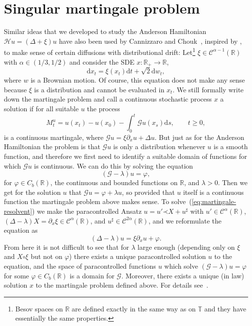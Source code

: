 \documentclass[a4paper, 11pt]{article}
\newcommand{\mathd}{\mathrm{d}}
\newcommand{\para}{\mathord{\prec}}
\newcommand{\reso}{\mathord{\circ}}
\begin{document}
\section{Singular martingale problem}
\label{sec:operators2}
Similar ideas that we developed to study the Anderson Hamiltonian
$\mathcal{H}u = (\Delta + \xi) u$ have also been used by Cannizzaro and Chouk~\cite{cannizzaro_multidimensional_2015}, inspired by \cite{delarue_rough_2016}, to make sense
of certain diffusions with distributional drift: Let\footnote{Besov spaces on $\mathbb{R}$ are defined exactly in the same way as on $\mathbb{T}$ and they have essentially the same properties.} $\xi \in
\mathcal{C}^{\alpha - 1} (\mathbb{R})$ with $\alpha \in (1 / 3, 1 / 2)$ and
consider the SDE $x\colon \mathbb{R}_+ \rightarrow \mathbb{R}$,
\[ \mathd x_t = \xi (x_t) \mathd t + \sqrt{2} \mathd w_t, \]
where $w$ is a Brownian motion. Of course, this equation does not make any
sense because $\xi$ is a distribution and cannot be evaluated in $x_t$. We
still formally write down the martingale problem and call a continuous
stochastic process $x$ a solution if for all suitable $u$ the process
\[ M^u_t = u (x_t) - u (x_0) - \int_0^t \mathcal{G}u (x_s) \mathd s, \qquad t
   \geqslant 0, \]
is a continuous martingale, where $\mathcal{G}u = \xi \partial_x u + \Delta
u$. But just as for the Anderson Hamiltonian the problem is that
$\mathcal{G}u$ is only a distribution whenever $u$ is a smooth function, and
therefore we first need to identify a suitable domain of functions for which
$\mathcal{G}u$ is continuous. We can do this by solving the equation
\begin{equation}
  \label{eq:martingale-resolvent} (\mathcal{G}- \lambda) u = \varphi,
\end{equation}
for $\varphi \in C_b (\mathbb{R})$, the continuous and bounded functions on
$\mathbb{R}$, and $\lambda > 0$. Then we get for the solution $u$ that
$\mathcal{G}u = \varphi + \lambda u$, so provided that $u$ itself is a
continuous function the martingale problem above makes sense. To
solve~(\ref{eq:martingale-resolvent}) we make the paracontrolled Ansatz $u = u' \para X +
u^{\sharp}$ with $u' \in \mathcal{C}^{\alpha} (\mathbb{R})$, $(\Delta -
\lambda) X = \partial_x \xi \in \mathcal{C}^{\alpha} (\mathbb{R})$, and
$u^{\sharp} \in \mathcal{C}^{2 \alpha} (\mathbb{R})$, and we reformulate the
equation as
\[ (\Delta - \lambda) u = \xi \partial_x u + \varphi . \]
From here it is not difficult to see that for $\lambda$ large enough
(depending only on $\xi$ and $X \reso \xi$ but not on $\varphi$) there exists
a unique paracontrolled solution $u$ to the equation, and the space of
paracontrolled functions $u$ which solve $(\mathcal{G}- \lambda) u = \varphi$ for some
$\varphi \in C_b (\mathbb{R})$ is a domain for $\mathcal{G}$. Moreover, there
exists a unique (in law) solution $x$ to the martingale problem defined above.
For details see~\cite{cannizzaro_multidimensional_2015}.
\end{document}
